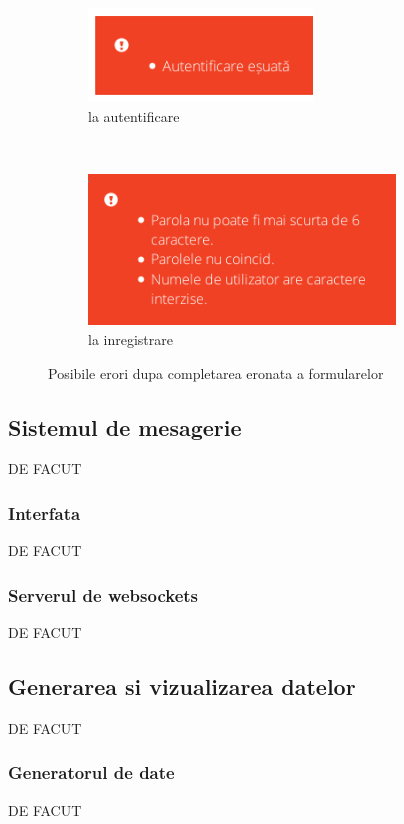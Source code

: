 \documentclass[12pt,a4paper]{article}
\begin{document}
\begin{figure}[h!]
        \centering
        \begin{subfigure}[b]{0.35\textwidth}
                \includegraphics[height=2.5cm]{img/fail1.png}
                \caption{la autentificare}
        \end{subfigure}%
        ~ \qquad 
        \begin{subfigure}[b]{0.55\textwidth}
                \includegraphics[height=4cm]{img/fail2.png}
                \caption{la inregistrare}
        \end{subfigure}
        \caption{Posibile erori dupa completarea eronata a formularelor}%
\end{figure}


\subsection{Sistemul de mesagerie}
DE FACUT

\subsubsection{Interfata}
DE FACUT

\subsubsection{Serverul de websockets}
DE FACUT
\subsection{Generarea si vizualizarea datelor}
DE FACUT
\subsubsection{Generatorul de date}
DE FACUT
\end{document}
